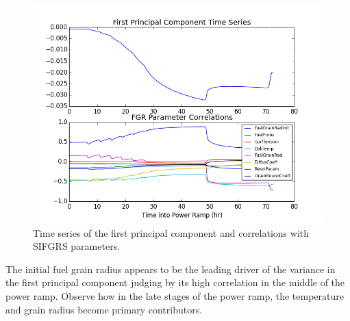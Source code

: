 \begin{figure}
\caption{\label{fig:principalCompTS}
Time series of the first principal component and correlations with \ac{SIFGRS} parameters.}
 \begin{center}
  \includegraphics[scale=.75]{./Chapter4/firstPrincComp_FGR_Correlations.png}
 \end{center}
\end{figure}
The initial fuel grain radius appears to be the leading driver of the variance in the first principal component judging by its high correlation in the middle of the power ramp. Observe how in the late stages of the power ramp, the temperature and grain radius become primary contributors. 
